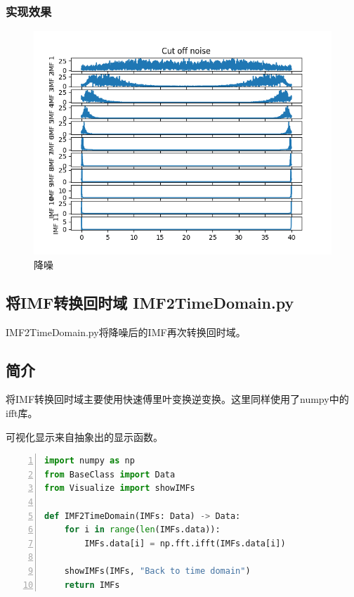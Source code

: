 \documentclass[cs4size,a4paper]{ctexart}
\numberwithin{equation}{section}
\numberwithin{table}{section}
\numberwithin{figure}{section}
\begin{document}
\subsubsection{实现效果}

\begin{figure}[H]
\small
\centering
\includegraphics{cutoffnoise.png}
\caption{降噪} \label{fig:cutoffnoise}
\end{figure}

\subsection{将IMF转换回时域 IMF2TimeDomain.py}

\colorbox{LetMeFlyGray}{IMF2TimeDomain.py}将降噪后的IMF再次转换回时域。

\subsection{简介}

将IMF转换回时域主要使用快速傅里叶变换逆变换。这里同样使用了numpy中的ifft库。

可视化显示来自抽象出的显示函数。

\begin{lstlisting}[language={python},
numbers=left,
numberstyle=\tiny\monaco,
basicstyle=\footnotesize\monaco]
import numpy as np
from BaseClass import Data
from Visualize import showIMFs

def IMF2TimeDomain(IMFs: Data) -> Data:
    for i in range(len(IMFs.data)):
        IMFs.data[i] = np.fft.ifft(IMFs.data[i])
    
    showIMFs(IMFs, "Back to time domain")
    return IMFs

\end{lstlisting}
\end{document}
